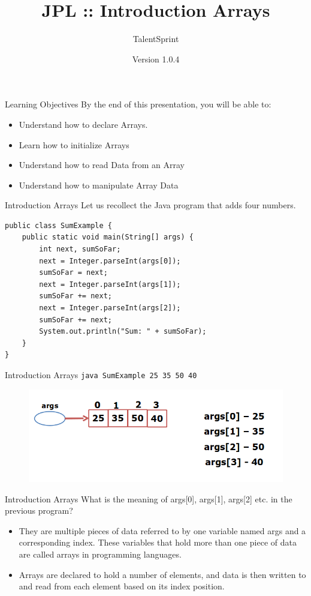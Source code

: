 \documentclass[14pt]{beamer}
\title[JPL:Java:02]{JPL :: Introduction Arrays}
\author[TS]{TalentSprint}
\institute[L\&D]{Licensed To Skill}
\date{Version 1.0.4}
\begin{document}
\begin{frame}
  \titlepage
\end{frame}

\begin{frame}{Learning Objectives}
By the end of this presentation, you will be able to:
\begin{itemize}
\item Understand how to declare Arrays.
\item Learn how to initialize Arrays
\item Understand how to read Data from an Array
\item Understand how to manipulate Array Data
\end{itemize}
\end{frame}

\begin{frame}[fragile]{Introduction Arrays}
Let us recollect the Java program that adds four numbers.
\begin{lstlisting}[numbers=none]
public class SumExample {
    public static void main(String[] args) {
        int next, sumSoFar;
        next = Integer.parseInt(args[0]);
        sumSoFar = next;
        next = Integer.parseInt(args[1]);
        sumSoFar += next;
        next = Integer.parseInt(args[2]);
        sumSoFar += next;
        System.out.println("Sum: " + sumSoFar);
    }
}
\end{lstlisting}
\end{frame}

\begin{frame}[fragile]{Introduction Arrays}
\lstinline!java SumExample 25 35 50 40!
\begin{figure}[H]
\begin{center}
\includegraphics[scale=.45]{array-execution.png}
\end{center}
\end{figure}

\end{frame}

\begin{frame}{Introduction Arrays}
What is the meaning of args[0], args[1], args[2] etc. in the previous program?
\begin{itemize}
\item They are multiple pieces of data referred to by one variable named args and a corresponding index. These variables that hold more than one piece of data are called arrays in programming languages. 
\item Arrays are declared to hold a number of elements, and data is then written to and read from each element based on its index position.
\end{itemize}
\end{frame}
\end{document}
